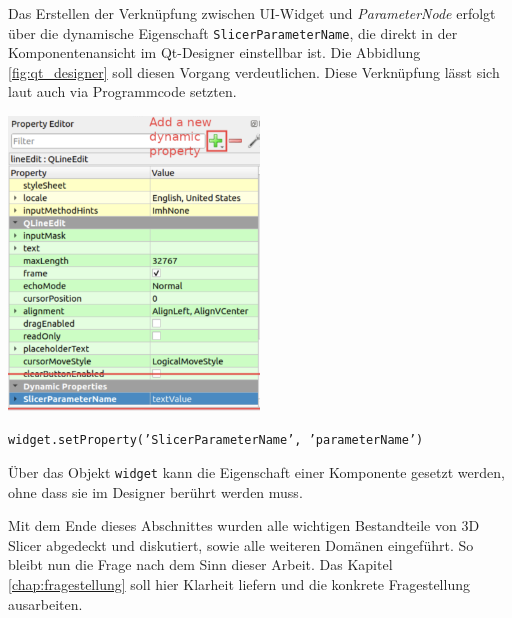 \begin{minipage}{0.35\textwidth}
	Das Erstellen der Verknüpfung zwischen \ac{UI}-Widget und \textit{ParameterNode}
	erfolgt über die dynamische Eigenschaft \texttt{SlicerParameterName}, die direkt
	in der Komponentenansicht im Qt-Designer einstellbar ist. Die Abbidlung
	\ref{fig:qt_designer} soll diesen Vorgang verdeutlichen. Diese Verknüpfung lässt
	sich laut \citet{slicer2024} auch via Programmcode setzten.
\end{minipage}
\hfill
\begin{minipage}{0.55\textwidth}
	\centering
	\includegraphics[width=0.5\textwidth]{img/qt_designer.jpg}
	\label{fig:qt_designer}
\end{minipage}

\begin{center}
	\texttt{widget.setProperty('SlicerParameterName', 'parameterName')}
\end{center}

Über das Objekt \texttt{widget} kann die Eigenschaft einer Komponente gesetzt
werden, ohne dass sie im Designer berührt werden muss.

Mit dem Ende dieses Abschnittes wurden alle wichtigen Bestandteile von 3D Slicer
abgedeckt und diskutiert, sowie alle weiteren Domänen eingeführt. So bleibt nun die
Frage nach dem Sinn dieser Arbeit. Das Kapitel \ref{chap:fragestellung} soll
hier Klarheit liefern und die konkrete Fragestellung ausarbeiten.
